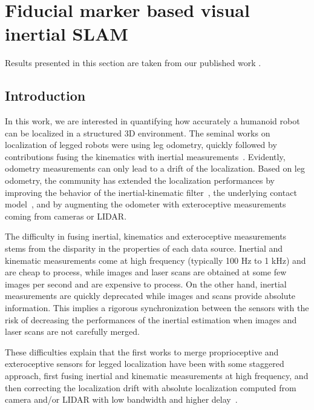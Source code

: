 \chapter{Fiducial marker based visual inertial SLAM}
\minitoc


Results presented in this section are taken from our published work \cite{fourmy2019absolute}.

\section{Introduction}

In this work, we are interested in quantifying how accurately a humanoid robot can be localized in a structured 3D environment.
The seminal works on localization of legged robots were using leg odometry, quickly followed by contributions fusing the kinematics 
with inertial measurements~\cite{lin_hexafusion_tro06}. Evidently, odometry measurements can only lead to a drift of the localization.
Based on leg odometry, the community has extended the localization performances by improving the behavior of the inertial-kinematic 
filter~\cite{bloesch2013state,rotella2014state,flayols2017experimental}, the underlying contact 
model~\cite{bledt2018cheetah,rotella2018unsupervised}, and by augmenting the odometer with exteroceptive measurements coming from cameras or LIDAR.


The difficulty in fusing inertial, kinematics and exteroceptive measurements stems from the disparity in the properties of each data source.
Inertial and kinematic measurements come at high frequency (typically 100 Hz to 1 kHz) and are cheap to process, while images and laser scans 
are obtained at some few images per second and are expensive to process. 
On the other hand, inertial measurements are quickly deprecated while images and scans provide absolute information.
This implies a rigorous synchronization between the sensors with the risk of decreasing the performances of the inertial 
estimation when images and laser scans are not carefully merged. 

These difficulties explain that the first works to merge proprioceptive and exteroceptive sensors for legged localization 
have been with some staggered approach, first fusing inertial and kinematic measurements at high frequency, and then correcting 
the localization drift with absolute localization computed from camera and/or LIDAR with low bandwidth and higher delay~\cite{nobili2017heterogeneous,fallon2014drift}.

